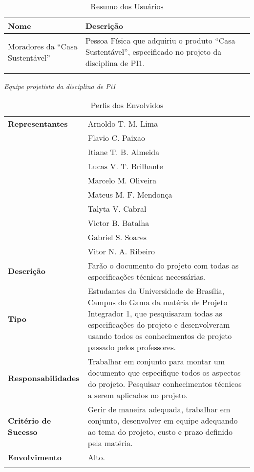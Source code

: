 
\begin{longtable}{|m{5cm}|m{10cm}|}
	\hline \textbf{Nome} & \textbf{Descrição}\\
	\hline Moradores da “Casa Sustentável” & Pessoa Física que adquiriu o produto “Casa Sustentável”, especificado no
	projeto da disciplina de PI1.\\
	\hline
\caption{Resumo dos Usuários}
\label{Resumo_dos_Usuarios}
\end{longtable}


\textit{Equipe projetista da disciplina de Pi1}

\begin{longtable}{|m{5cm}|m{10cm}|}
	\hline \textbf{Representantes} & Arnoldo T. M. Lima\\ & Flavio C. Paixao\\ & Itiane T. B. Almeida\\ & Lucas V. T.
	Brilhante\\ & Marcelo M. Oliveira\\ & Mateus M. F. Mendon\c{c}a\\ & Talyta V. Cabral\\ & Victor B. Batalha\\ &
	Gabriel S. Soares\\ & Vitor N. A. Ribeiro\\
	\hline \textbf{Descrição} & Farão o documento do projeto com todas as especificações técnicas necessárias.\\
	\hline \textbf{Tipo} & Estudantes da Universidade de Brasília, Campus do Gama da matéria de Projeto Integrador 1,
	que pesquisaram todas as especificações do projeto e desenvolveram usando todos os conhecimentos de projeto passado
	pelos professores.\\
	\hline \textbf{Responsabilidades} & Trabalhar em conjunto para montar um documento que especifique todos os aspectos
	 do projeto. Pesquisar conhecimentos técnicos a serem aplicados no projeto.\\
	\hline \textbf{Critério de Sucesso} & Gerir de maneira adequada, trabalhar em conjunto, desenvolver em equipe
	adequando ao tema do projeto, custo e prazo definido pela matéria.\\
	\hline \textbf{Envolvimento} & Alto.\\
	\hline
\caption{Perfis dos Envolvidos}
\label{Perfis_dos_Envolvidos}
\end{longtable}

